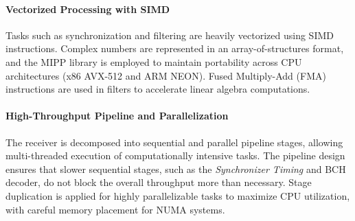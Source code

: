 \documentclass[11pt]{report}
\begin{document}
\paragraph{Vectorized Processing with SIMD}

Tasks such as synchronization and filtering are heavily vectorized using SIMD
instructions. Complex numbers are represented in an array-of-structures format,
and the MIPP library is employed to maintain portability across CPU
architectures (x86 AVX-512 and ARM NEON). Fused Multiply-Add (FMA) instructions
are used in filters to accelerate linear algebra computations.


\paragraph{High-Throughput Pipeline and Parallelization}

The receiver is decomposed into sequential and parallel pipeline stages,
allowing multi-threaded execution of computationally intensive tasks. The
pipeline design ensures that slower sequential stages, such as the
\emph{Synchronizer Timing} and BCH decoder, do not block the overall throughput
more than necessary. Stage duplication is applied for highly parallelizable
tasks to maximize CPU utilization, with careful memory placement for NUMA
systems.
\end{document}

